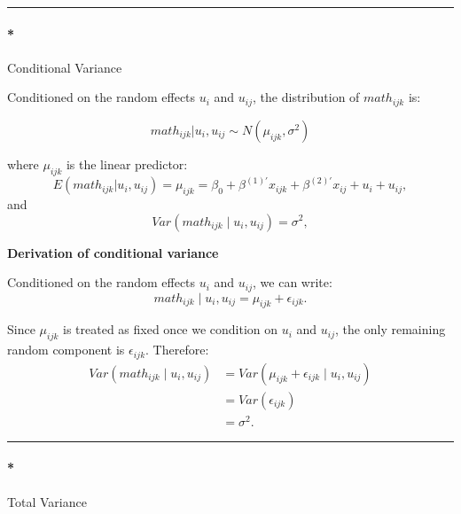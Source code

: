 \documentclass[
  letterpaper,
  DIV=11,
  numbers=noendperiod]{scrreprt}
\let\oldparagraph\paragraph
\renewcommand{\paragraph}[1]{\oldparagraph{#1}\mbox{}}
\begin{document}
\begin{center}\rule{0.5\linewidth}{0.5pt}\end{center}

\hypertarget{conditional-variance}{%
\paragraph*{Conditional Variance}\label{conditional-variance}}

Conditioned on the random effects \(u_i\) and \(u_{ij}\), the
distribution of \(math_{ijk}\) is:

\[
math_{ijk}|u_i, u_{ij} \sim N(\mu_{ijk}, \sigma^2)
\]

where \(\mu_{ijk}\) is the linear predictor: \[
E(math_{ijk}|u_i, u_{ij}) = \mu_{ijk} = \beta_0 + \beta^{(1)'} x_{ijk} + \beta^{(2)'} x_{ij} + u_i + u_{ij},
\] and \[
Var(math_{ijk} \mid u_i, u_{ij}) = \sigma^2,
\]

\begin{tcolorbox}[enhanced jigsaw, rightrule=.15mm, breakable, left=2mm, colframe=quarto-callout-tip-color-frame, opacityback=0, leftrule=.75mm, toprule=.15mm, colback=white, arc=.35mm, bottomrule=.15mm]

\textbf{Derivation of conditional variance}\vspace{2mm}

Conditioned on the random effects \(u_i\) and \(u_{ij}\), we can write:
\[
math_{ijk} \mid u_i, u_{ij} = \mu_{ijk} + \epsilon_{ijk}.
\]

Since \(\mu_{ijk}\) is treated as fixed once we condition on \(u_i\) and
\(u_{ij}\), the only remaining random component is \(\epsilon_{ijk}\).
Therefore: \[
\begin{aligned}
Var(math_{ijk} \mid u_i, u_{ij}) 
&= Var(\mu_{ijk} + \epsilon_{ijk} \mid u_i, u_{ij}) \\
&= Var(\epsilon_{ijk}) \\
&= \sigma^2.
\end{aligned}
\]

\end{tcolorbox}

\begin{center}\rule{0.5\linewidth}{0.5pt}\end{center}

\hypertarget{total-variance}{%
\paragraph*{Total Variance}\label{total-variance}}
\end{document}
